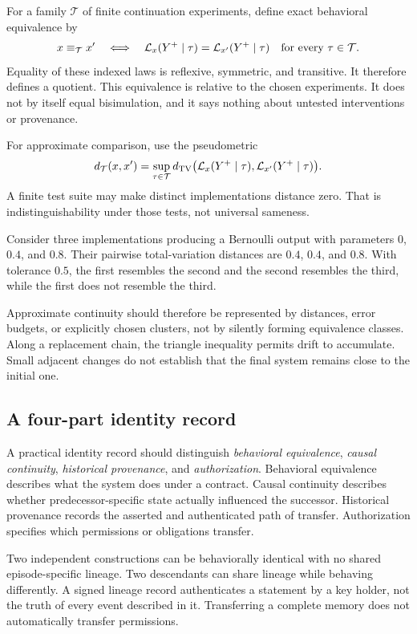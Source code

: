 For a family $\mathcal T$ of finite continuation experiments, define exact behavioral equivalence by
\[
x\equiv_{\mathcal T}x'\quad\Longleftrightarrow\quad
\mathcal L_x(Y^+\mid\tau)=\mathcal L_{x'}(Y^+\mid\tau)
\quad\text{for every }\tau\in\mathcal T.
\]
Equality of these indexed laws is reflexive, symmetric, and transitive. It therefore defines a quotient. This equivalence is relative to the chosen experiments. It does not by itself equal bisimulation, and it says nothing about untested interventions or provenance.

For approximate comparison, use the pseudometric
\[
d_{\mathcal T}(x,x')=\sup_{\tau\in\mathcal T}
d_{\mathrm{TV}}\bigl(\mathcal L_x(Y^+\mid\tau),\mathcal L_{x'}(Y^+\mid\tau)\bigr).
\]
A finite test suite may make distinct implementations distance zero. That is indistinguishability under those tests, not universal sameness.

\begin{MScounterexample}\label{MS:ex:identity}
Consider three implementations producing a Bernoulli output with parameters $0$, $0.4$, and $0.8$. Their pairwise total-variation distances are $0.4$, $0.4$, and $0.8$. With tolerance $0.5$, the first resembles the second and the second resembles the third, while the first does not resemble the third.
\end{MScounterexample}

Approximate continuity should therefore be represented by distances, error budgets, or explicitly chosen clusters, not by silently forming equivalence classes. Along a replacement chain, the triangle inequality permits drift to accumulate. Small adjacent changes do not establish that the final system remains close to the initial one.

\subsection{A four-part identity record}
A practical identity record should distinguish \emph{behavioral equivalence}, \emph{causal continuity}, \emph{historical provenance}, and \emph{authorization}. Behavioral equivalence describes what the system does under a contract. Causal continuity describes whether predecessor-specific state actually influenced the successor. Historical provenance records the asserted and authenticated path of transfer. Authorization specifies which permissions or obligations transfer.

Two independent constructions can be behaviorally identical with no shared episode-specific lineage. Two descendants can share lineage while behaving differently. A signed lineage record authenticates a statement by a key holder, not the truth of every event described in it. Transferring a complete memory does not automatically transfer permissions.


